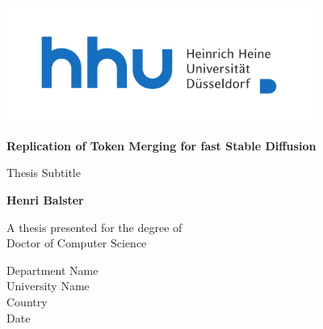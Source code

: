 \begin{titlepage}
    \centering
    \includegraphics[width=10cm]{static/Logo_HHU_+Name_horizontal_4c_+Safezone}\\

    \vspace*{1cm}

    \huge
    \textbf{Replication of Token Merging for fast Stable Diffusion}
    
    \large
    \vspace{1cm}
    Thesis Subtitle
            
    \vspace{1.5cm}

    \textbf{Henri Balster}

    \vfill
            
    A thesis presented for the degree of\\
    Doctor of Computer Science
            
    \vspace{0.8cm}
            
    Department Name\\
    University Name\\
    Country\\
    Date
            
\end{titlepage}